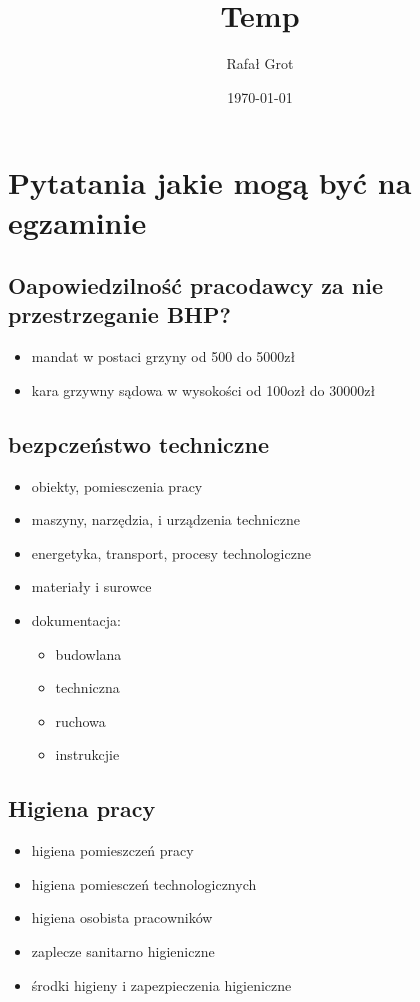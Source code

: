 \documentclass[11pt]{article}
\author{Rafał Grot}
\date{\today}
\title{Temp}
\begin{document}
\maketitle
\tableofcontents

\section{Pytatania jakie mogą być na egzaminie}
\label{sec:org1ccf71c}
\subsection{Oapowiedzilność pracodawcy za nie przestrzeganie BHP?}
\label{sec:orgc05fe0a}
\begin{itemize}
\item mandat w postaci grzyny od 500 do 5000zł
\item kara grzywny sądowa w wysokości od 100ozł do 30000zł
\end{itemize}
\subsection{bezpczeństwo techniczne}
\label{sec:org8157f7a}
\begin{itemize}
\item obiekty, pomiesczenia pracy
\item maszyny, narzędzia, i urządzenia techniczne
\item energetyka, transport, procesy technologiczne
\item materiały i surowce
\item dokumentacja:
\begin{itemize}
\item budowlana
\item techniczna
\item ruchowa
\item instrukcjie
\end{itemize}
\end{itemize}

\subsection{Higiena pracy}
\label{sec:orgb450b5e}
\begin{itemize}
\item higiena pomieszczeń pracy
\item higiena pomiesczeń technologicznych
\item higiena osobista pracowników
\item zaplecze sanitarno higieniczne
\item środki higieny i zapezpieczenia higieniczne
\end{itemize}
\end{document}
